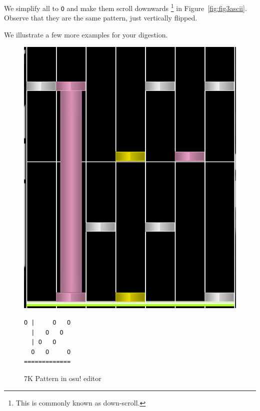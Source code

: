 We simplify all to \verb+O+ and make them scroll downwards \footnote{This is commonly known as down-scroll.} in Figure~\ref{fig:fig3ascii}.
Observe that they are the same pattern, just vertically flipped.

We illustrate a few more examples for your digestion.

\begin{figure}[H]
    \centering
    \begin{minipage}{.5\textwidth}
        \centering
        \includegraphics[scale=0.3]{imgs/osupattern}
    \end{minipage}%
    \begin{minipage}{0.5\textwidth}
        \centering
        \begin{verbatim}
O |     O   O
  |   O   O
  | O   O
  O   O     O
=============
        \end{verbatim}
    \end{minipage}
    \caption{7K Pattern in osu! editor}
    \label{fig:osupattern}
\end{figure}

